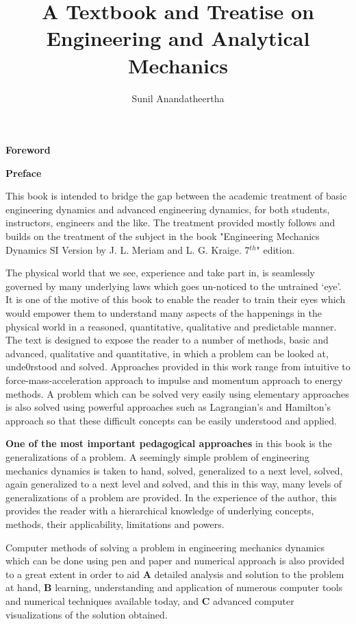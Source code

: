 \documentclass[]{book}
\author{Sunil Anandatheertha}\title{A Textbook and Treatise on Engineering and Analytical  Mechanics}
\begin{document}
\frontmatter

\tableofcontents

\mainmatter

{\flushleft\textbf{Foreword}}
\vspace{1cm}

\newpage

{\flushleft\textbf{Preface}}
\vspace{1cm}

This book is intended to bridge the gap between the academic treatment of basic engineering dynamics and advanced engineering dynamics, for both students, instructors, engineers and the like. The treatment provided mostly follows and builds on the treatment of the subject in the book "Engineering Mechanics Dynamics SI Version by J. L. Meriam and L. G. Kraige. 7$^{th}$" edition.

The physical world that we see, experience and take part in, is seamlessly governed by many underlying laws which goes un-noticed to the untrained `eye'. It is one of the motive of this book to enable the reader to train their eyes which would empower them to understand many aspects of the happenings in the physical world in a reasoned, quantitative, qualitative and predictable manner. The text is designed to expose the reader to a number of methods, basic and advanced, qualitative and quantitative, in which a problem can be looked at, unde0rstood and solved. Approaches provided in this work range from intuitive to force-mass-acceleration approach to impulse and momentum approach to energy methods. A problem which can be solved very easily using elementary approaches is also solved using powerful approaches such as Lagrangian's and Hamilton's approach so that these difficult concepts can be easily understood and applied. 

\textbf{One of the most important pedagogical approaches} in this book is the generalizations of a problem. A seemingly simple problem of engineering mechanics dynamics is taken to hand, solved, generalized to a next level, solved, again generalized to a next level and solved, and this in this way, many levels of generalizations of a problem are provided. In the experience of the author, this provides the reader with a hierarchical knowledge of underlying concepts, methods, their applicability, limitations and powers.

Computer methods of solving a problem in engineering mechanics dynamics which can be done using pen and paper and numerical approach is also provided to a great extent in order to aid \textbf{A} detailed analysis and solution to the problem at hand, \textbf{B} learning, understanding and application of numerous computer tools and numerical techniques available today, and \textbf{C} advanced computer visualizations of the solution obtained.
\end{document}
